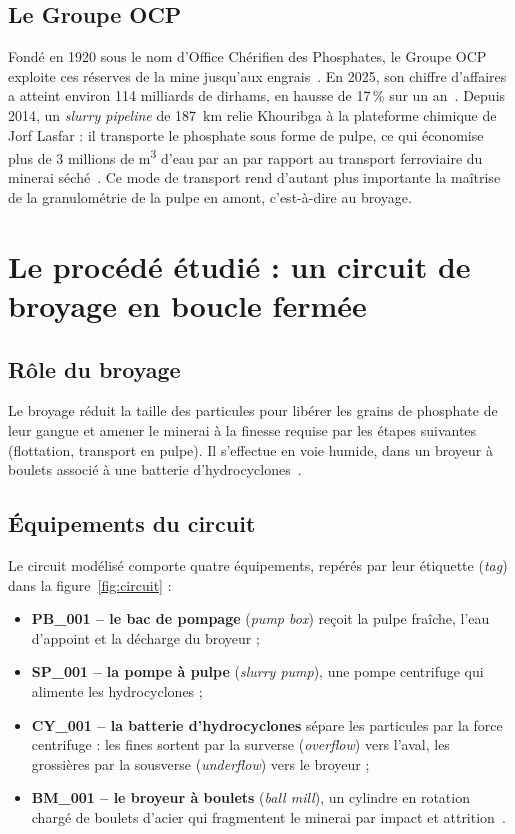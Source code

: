 \subsection{Le Groupe OCP}
Fondé en 1920 sous le nom d'Office Chérifien des Phosphates, le Groupe OCP exploite ces réserves de la mine jusqu'aux engrais~\cite{ocpwiki}. En 2025, son chiffre d'affaires a atteint environ 114 milliards de dirhams, en hausse de 17\,\% sur un an~\cite{ocpresultats2025}. Depuis 2014, un \textit{slurry pipeline} de 187~km relie Khouribga à la plateforme chimique de Jorf Lasfar : il transporte le phosphate sous forme de pulpe, ce qui économise plus de 3 millions de m\textsuperscript{3} d'eau par an par rapport au transport ferroviaire du minerai séché~\cite{ocppipeline}. Ce mode de transport rend d'autant plus importante la maîtrise de la granulométrie de la pulpe en amont, c'est-à-dire au broyage.

\section{Le procédé étudié : un circuit de broyage en boucle fermée}

\subsection{Rôle du broyage}
Le broyage réduit la taille des particules pour libérer les grains de phosphate de leur gangue et amener le minerai à la finesse requise par les étapes suivantes (flottation, transport en pulpe). Il s'effectue en voie humide, dans un broyeur à boulets associé à une batterie d'hydrocyclones~\cite{wills2016}.

\subsection{Équipements du circuit}
Le circuit modélisé comporte quatre équipements, repérés par leur étiquette (\textit{tag}) dans la figure~\ref{fig:circuit} :
\begin{itemize}
  \item \textbf{PB\_001 -- le bac de pompage} (\textit{pump box}) reçoit la pulpe fraîche, l'eau d'appoint et la décharge du broyeur ;
  \item \textbf{SP\_001 -- la pompe à pulpe} (\textit{slurry pump}), une pompe centrifuge qui alimente les hydrocyclones ;
  \item \textbf{CY\_001 -- la batterie d'hydrocyclones} sépare les particules par la force centrifuge : les fines sortent par la surverse (\textit{overflow}) vers l'aval, les grossières par la sousverse (\textit{underflow}) vers le broyeur ;
  \item \textbf{BM\_001 -- le broyeur à boulets} (\textit{ball mill}), un cylindre en rotation chargé de boulets d'acier qui fragmentent le minerai par impact et attrition~\cite{wills2016}.
\end{itemize}

